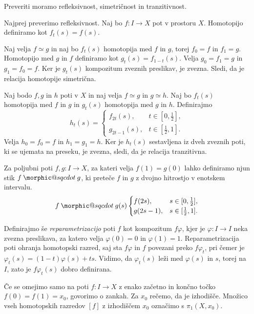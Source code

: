 \documentclass[mat1]{fmfdelo}
\makeatletter
\DeclareRobustCommand{\sqcdot}{\mathbin{\mathpalette\morphic@sqcdot\relax}}
\newcommand{\morphic@sqcdot}[2]{%
\sbox\z@{$\m@th#1\centerdot$}%
\ht\z@=.33333\ht\z@
\vcenter{\box\z@}%
}
\makeatother
\begin{document}
\begin{dokaz}
    Preveriti moramo refleksivnost, simetričnost in tranzitivnost.

    Najprej preverimo refleksivnost. Naj bo $f \colon  I \rightarrow X$ pot v prostoru $X$. Homotopijo definiramo kot $f_t(s)=f(s)$.
    
    Naj velja $f \simeq g$ in naj bo $f_t(s)$ homotopija med $f$ in $g$, 
    torej $f_0=f$ in $f_1=g$. Homotopijo med $g$ in $f$ definiramo kot 
    $g_t(s)=f_{1-t}(s)$. Velja $g_0=f_1=g$ in $g_1=f_0=f$. Ker je 
    $g_t(s)$ kompozitum zveznih preslikav, je zvezna. Sledi, da je 
    relacija homotopije simetrična.
    
    Naj bodo $f, g \text{ in } h$ poti v $X$ in naj velja $f \simeq g$ 
    in $g \simeq h$. Naj bo $f_t(s)$ homotopija med $f$ in $g$ in 
    $g_t(s)$ homotopija med $g$ in $h$. Definirajmo 
    $$h_t(s)=\begin{cases}
        f_{2t}(s), & t \in [0,\frac{1}{2}], \\
        g_{2t-1}(s), & t \in [\frac{1}{2},1].
    \end{cases}
    $$
    Velja $h_0=f_0=f$ in $h_1=g_1=h$. Ker je $h_t(s)$ sestavljena iz dveh zveznih poti, ki se ujemata na preseku, je zvezna, sledi, da je relacija tranzitivna.
\end{dokaz}

Za poljubni poti $f,g \colon  I \rightarrow X$, za kateri velja $f(1) = g(0)$ 
lahko definiramo njun stik $f \sqcdot g$, ki preteče $f$ in $g$ z dvojno 
hitrostjo v enotskem intervalu.
$$ f \sqcdot g(s) \begin{cases}
    f(2s), &s \in [0,\frac{1}{2}], \\
    g(2s-1), & s \in [\frac{1}{2},1].
\end{cases}
$$

Definirajmo še \emph{reparametrizacijo} poti $f$ kot kompozitum $f 
    \varphi$, kjer je $\varphi\colon  I \rightarrow I$ neka zvezna preslikava, za 
    katero velja $\varphi(0)= 0$ in $\varphi(1)=1$. Reparametrizacija poti 
    ohranja homotopski razred, saj sta $f\varphi$ in $f$ povezani preko 
    $f\varphi_t$, pri čemer je $\varphi_t(s)=(1-t)\varphi(s)+ts$. Vidimo, da 
    $\varphi_t(s)$ leži med $\varphi(s)$ in $s$, torej na $I$, zato je 
    $f\varphi_t(s)$ dobro definirana.



    Če se omejimo samo na poti $f\colon I \rightarrow X$ z enako začetno in končno točko $f(0) = f(1) = x_0$, govorimo o zankah. Za $x_0$ rečemo, da je izhodišče.
    Množico vseh homotopskih razredov $[f]$ z izhodiščem $x_0$ označimo s $\pi_1(X,x_0)$.
    
\end{document}

